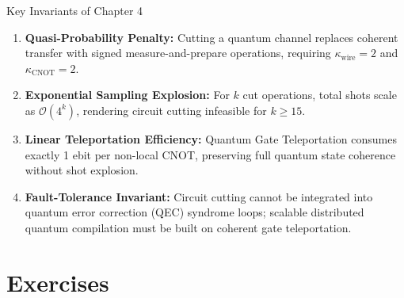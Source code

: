 
\begin{summarybox}{Key Invariants of Chapter 4}
\begin{enumerate}
    \item \textbf{Quasi-Probability Penalty:} Cutting a quantum channel replaces coherent transfer with signed measure-and-prepare operations, requiring $\kappa_{\text{wire}} = 2$ and $\kappa_{\text{CNOT}} = 2$.
    \item \textbf{Exponential Sampling Explosion:} For $k$ cut operations, total shots scale as $\mathcal{O}(4^k)$, rendering circuit cutting infeasible for $k \ge 15$.
    \item \textbf{Linear Teleportation Efficiency:} Quantum Gate Teleportation consumes exactly 1 ebit per non-local CNOT, preserving full quantum state coherence without shot explosion.
    \item \textbf{Fault-Tolerance Invariant:} Circuit cutting cannot be integrated into quantum error correction (QEC) syndrome loops; scalable distributed quantum compilation must be built on coherent gate teleportation.
\end{enumerate}
\end{summarybox}


\section*{Exercises}

